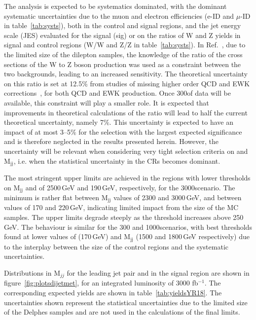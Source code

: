 \documentclass[../report.tex]{subfiles}
\begin{document}
The analysis is expected to be systematics dominated, with the
dominant systematic uncertainties due to the muon and electron
efficiencies (e-ID and $\mu$-ID in table~\ref{tab:systs}), both in the control and signal regions, and the jet
energy scale (JES) evaluated for the signal (sig) or on the ratios of W and Z yields in signal and control regions (W/W and Z/Z in table~\ref{tab:systs}). In Ref.~\cite{Sirunyan:2018owy}, due to the limited size of the dilepton
samples, the knowledge of the ratio of the cross sections of the W to
Z boson production was used as a constraint between the two
backgrounds, leading to an increased sensitivity. The theoretical
uncertainty on this ratio is set at 12.5\% from studies of missing
higher order QCD and EWK corrections~\cite{Sirunyan:2018owy}, for both
QCD and EWK production. Once 300\fbinv of data will be available, this
constraint will play a smaller role. It is expected that improvements
in theoretical calculations of the ratio will lead to half the current
theoretical uncertainty, namely 7\%.  This uncertainty is expected to
have an impact of at most 3--5\% for the selection with the largest
expected significance and is therefore neglected in the results
presented herein. However, the uncertainty will be relevant when
considering very tight selection criteria on \MET and M$_{\text{jj}}$,
i.e. when the statistical uncertainty in the CRs becomes dominant.


The most stringent upper limits are achieved in the regions with lower
thresholds on M$_{\text{jj}}$ and \MET of 2500\,GeV and 190\,GeV,
respectively, for the 3000\fbinv scenario. The minimum is rather flat
between M$_{\text{jj}}$ values of 2300 and 3000\,GeV, and between
\MET values of 170 and 220\,GeV, indicating limited impact from the size of the MC
samples. The upper limits degrade steeply as the \MET threshold
increases above 250\,GeV. The behaviour is similar for the 300 and
1000\fbinv scenarios, with best thresholds found at lower values
of \MET (170\,GeV) and M$_{\text{jj}}$ (1500 and 1800\,GeV respectively)
due to the interplay between the size of the control regions and the
systematic uncertainties.

Distributions in M$_{jj}$ for
the leading jet pair and \MET in the signal region are shown in
figure~\ref{fig:plotsdijetmet}, for an integrated luminosity of 3000 fb$^{-1}$. The
corresponding expected yields are shown in
table~\ref{tab:yieldsYR18}. The uncertainties shown represent the statistical 
uncertainties due to the limited size of the Delphes samples and are not used in the calculations
of the final limits.
\end{document}
